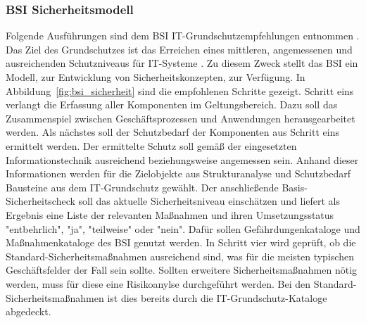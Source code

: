 \documentclass[11pt,a4paper]{report}
\begin{document}
\subsubsection{BSI Sicherheitsmodell}

Folgende Ausführungen sind dem BSI IT-Grundschutzempfehlungen entnommen \cite{bsi_grundsch1,bsi_grundsch2,bsi_grundsch3,bsi_grundsch4}.
Das Ziel des Grundschutzes ist das Erreichen eines mittleren, angemessenen und ausreichenden Schutzniveaus für IT-Systeme \cite{wiki_itgrundschutz}. Zu diesem Zweck stellt das BSI ein Modell, zur Entwicklung von Sicherheitskonzepten, zur Verfügung. In Abbildung~\ref{fig:bsi_sicherheit} sind die empfohlenen Schritte gezeigt. Schritt eins verlangt die Erfassung aller Komponenten im Geltungsbereich. Dazu soll das Zusammenspiel zwischen Geschäftsprozessen und Anwendungen herausgearbeitet werden. Als nächstes soll der Schutzbedarf der Komponenten aus Schritt eins ermittelt werden. Der ermittelte Schutz soll gemäß der eingesetzten Informationstechnik ausreichend beziehungsweise angemessen sein. Anhand dieser Informationen werden für die Zielobjekte aus Strukturanalyse und Schutzbedarf Bausteine aus dem IT-Grundschutz gewählt. Der anschließende Basis-Sicherheitscheck soll das aktuelle Sicherheitsniveau einschätzen und liefert als Ergebnis eine Liste der relevanten Maßnahmen und ihren Umsetzungsstatus "entbehrlich", "ja", "teilweise" oder "nein". Dafür sollen Gefährdungenkataloge und Maßnahmenkataloge des BSI genutzt werden. In Schritt vier wird geprüft, ob die Standard-Sicherheitsmaßnahmen ausreichend sind, was für die meisten typischen Geschäftsfelder der Fall sein sollte. Sollten erweitere Sicherheitsmaßnahmen nötig werden, muss für diese eine Risikoanylse durchgeführt werden. Bei den Standard-Sicherheitsmaßnahmen ist dies bereits durch die IT-Grundschutz-Kataloge abgedeckt. 
\end{document}
